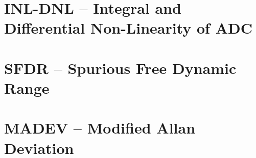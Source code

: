 \documentclass[12pt,a4paper,oneside]{report} %
\begin{document}
\chapter{INL-DNL -- Integral and Differential Non-Linearity of ADC} %
\section*{\infosection} %

\section*{\examplesection} %


\chapter{SFDR -- Spurious Free Dynamic Range} %
\section*{\infosection} %

\section*{\examplesection} %


\chapter{MADEV -- Modified Allan Deviation} %
\section*{\infosection} %

\section*{\examplesection} %

\end{document}

